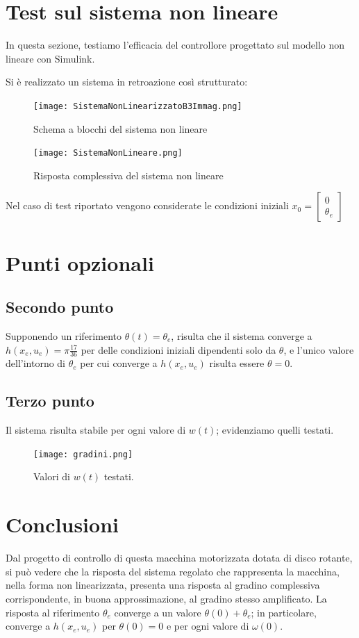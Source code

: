 \documentclass[a4paper, 11pt]{article}
\begin{document}
	\section{Test sul sistema non lineare}
	
	In questa sezione, testiamo l'efficacia del controllore progettato sul modello non lineare con Simulink.
	
	Si è realizzato un sistema in retroazione così strutturato:
	
	\begin{figure}[h]
		\centering
		\texttt{[image: SistemaNonLinearizzatoB3Immag.png]}
		\caption{Schema a blocchi del sistema non lineare}
		\label{fig:SistemaNonLineare}
	\end{figure}
	
	
	\begin{figure}[h]
		\centering
		\texttt{[image: SistemaNonLineare.png]}
		\caption{Risposta complessiva del sistema non lineare}
		\label{fig:RispostaNonLineare}
	\end{figure}
	Nel caso di test riportato vengono considerate le condizioni iniziali $x_0 = \begin{bmatrix}
		0 \\
		\theta_e
	\end{bmatrix}$
	\newpage
	
	\section{Punti opzionali}
	
	\subsection{Secondo punto}
	Supponendo un riferimento $\theta(t) = \theta_e$, risulta che il sistema converge a $h(x_e,u_e) = \pi\frac{17}{36}$ per delle condizioni iniziali dipendenti solo da $\theta$, e l'unico valore dell'intorno di $\theta_e$ per cui converge a  $h(x_e,u_e)$ risulta essere $\theta=0$.
	
	\subsection{Terzo punto}
	
	Il sistema risulta stabile per ogni valore di $w(t)$; evidenziamo quelli testati.
	
	\begin{figure}[h]
		\centering
		\texttt{[image: gradini.png]}
		\caption{Valori di $w(t)$ testati.}
		\label{fig:gradini}
	\end{figure}
	
	\section{Conclusioni}
	Dal progetto di controllo di questa macchina motorizzata dotata di disco rotante,
	si può vedere che la risposta del sistema regolato che rappresenta la macchina,
	nella forma non linearizzata, presenta una risposta al gradino complessiva corrispondente, in buona approssimazione, al gradino stesso amplificato.
	La risposta al riferimento $\theta_e$ converge a un valore $\theta(0) + \theta_e$; in particolare, converge a $h(x_e,u_e)$ per $\theta(0) = 0$ e per ogni valore di $\omega(0)$.
	
\end{document}
